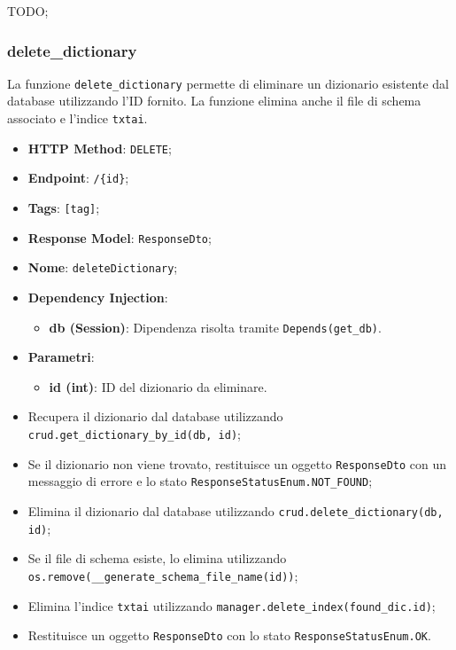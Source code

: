 \par TODO;

\subsubsection{delete\_dictionary}

\par La funzione \texttt{delete\_dictionary} permette di eliminare un dizionario esistente dal database utilizzando l'ID fornito. La funzione elimina anche il file di schema associato e l'indice \texttt{txtai}.

\begin{itemize}
 \item \textbf{HTTP Method}: \texttt{DELETE};
 \item \textbf{Endpoint}: \texttt{/\{id\}};
 \item \textbf{Tags}: \texttt{[tag]};
 \item \textbf{Response Model}: \texttt{ResponseDto};
 \item \textbf{Nome}: \texttt{deleteDictionary};
 \item \textbf{Dependency Injection}:
  \begin{itemize}
    \item \textbf{db (Session)}: Dipendenza risolta tramite \texttt{Depends(get\_db)}.
  \end{itemize}
 \item \textbf{Parametri}:
  \begin{itemize}
    \item \textbf{id (int)}: ID del dizionario da eliminare.
  \end{itemize}
\end{itemize}

\begin{itemize}
 \item Recupera il dizionario dal database utilizzando \texttt{crud.get\_dictionary\_by\_id(db, id)};
 \item Se il dizionario non viene trovato, restituisce un oggetto \texttt{ResponseDto} con un messaggio di errore e lo stato \texttt{ResponseStatusEnum.NOT\_FOUND};
 \item Elimina il dizionario dal database utilizzando \texttt{crud.delete\_dictionary(db, id)};
 \item Se il file di schema esiste, lo elimina utilizzando \texttt{os.remove(\_\_generate\_schema\_file\_name(id))};
 \item Elimina l'indice \texttt{txtai} utilizzando \texttt{manager.delete\_index(found\_dic.id)};
 \item Restituisce un oggetto \texttt{ResponseDto} con lo stato \texttt{ResponseStatusEnum.OK}.
\end{itemize}

